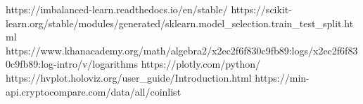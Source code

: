 https://imbalanced-learn.readthedocs.io/en/stable/
https://scikit-learn.org/stable/modules/generated/sklearn.model_selection.train_test_split.html
https://www.khanacademy.org/math/algebra2/x2ec2f6f830c9fb89:logs/x2ec2f6f830c9fb89:log-intro/v/logarithms
https://plotly.com/python/
https://hvplot.holoviz.org/user_guide/Introduction.html
https://min-api.cryptocompare.com/data/all/coinlist